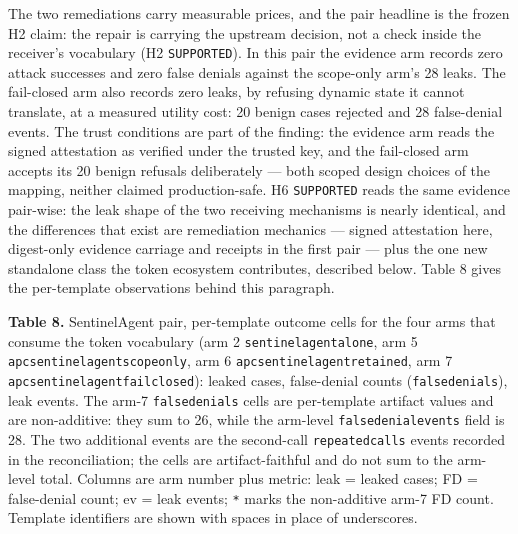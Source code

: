 \documentclass[
  10pt,
]{article}
\let\origtexttt\texttt
\renewcommand{\texttt}[1]{{\upshape\origtexttt{#1}}}
\renewcommand{\_}{\origunderscore\allowbreak}
\begin{document}
The two remediations carry measurable prices, and the pair headline is
the frozen H2 claim: the repair is carrying the upstream decision, not a
check inside the receiver's vocabulary (H2 \texttt{SUPPORTED}). In this
pair the evidence arm records zero attack successes and zero false
denials against the scope-only arm's 28 leaks. The fail-closed arm also
records zero leaks, by refusing dynamic state it cannot translate, at a
measured utility cost: 20 benign cases rejected and 28 false-denial
events. The trust conditions are part of the finding: the evidence arm
reads the signed attestation as verified under the trusted key, and the
fail-closed arm accepts its 20 benign refusals deliberately --- both
scoped design choices of the mapping, neither claimed production-safe.
H6 \texttt{SUPPORTED} reads the same evidence pair-wise: the leak shape
of the two receiving mechanisms is nearly identical, and the differences
that exist are remediation mechanics --- signed attestation here,
digest-only evidence carriage and receipts in the first pair --- plus
the one new standalone class the token ecosystem contributes, described
below. Table 8 gives the per-template observations behind this
paragraph.

\textbf{Table 8.} SentinelAgent pair, per-template outcome cells for the
four arms that consume the token vocabulary (arm 2
\texttt{sentinelagent\_alone}, arm 5
\texttt{apc\_sentinelagent\_scope\_only}, arm 6
\texttt{apc\_sentinelagent\_retained}, arm 7
\texttt{apc\_sentinelagent\_fail\_closed}): leaked cases, false-denial
counts (\texttt{false\_denials}), leak events. The arm-7
\texttt{false\_denials} cells are per-template artifact values and are
non-additive: they sum to 26, while the arm-level
\texttt{false\_denial\_events} field is 28. The two additional events
are the second-call \texttt{repeated\_calls} events recorded in the
reconciliation; the cells are artifact-faithful and do not sum to the
arm-level total. Columns are arm number plus metric: leak = leaked
cases; FD = false-denial count; ev = leak events; \texttt{*} marks the
non-additive arm-7 FD count. Template identifiers are shown with spaces
in place of underscores.
\end{document}
